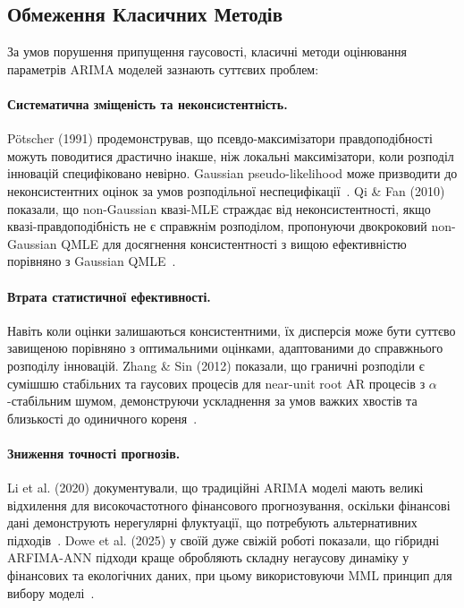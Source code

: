 \documentclass[12pt,a4paper]{article}
\begin{document}
\subsection{Обмеження Класичних Методів}
\label{subsec:limitations}

За умов порушення припущення гаусовості, класичні методи оцінювання параметрів ARIMA моделей зазнають суттєвих проблем:

\paragraph{Систематична зміщеність та неконсистентність.} Pötscher (1991) продемонстрував, що псевдо-максимізатори правдоподібності можуть поводитися драстично інакше, ніж локальні максимізатори, коли розподіл інновацій специфіковано невірно. Gaussian pseudo-likelihood може призводити до неконсистентних оцінок за умов розподільної неспецифікації~\cite{potscher1991noninvertibility}. Qi \& Fan (2010) показали, що non-Gaussian квазі-MLE страждає від неконсистентності, якщо квазі-правдоподібність не є справжнім розподілом, пропонуючи двокроковий non-Gaussian QMLE для досягнення консистентності з вищою ефективністю порівняно з Gaussian QMLE~\cite{qi2010non}.

\paragraph{Втрата статистичної ефективності.} Навіть коли оцінки залишаються консистентними, їх дисперсія може бути суттєво завищеною порівняно з оптимальними оцінками, адаптованими до справжнього розподілу інновацій. Zhang \& Sin (2012) показали, що граничні розподіли є сумішшю стабільних та гаусових процесів для near-unit root AR процесів з $\alpha$-стабільним шумом, демонструючи ускладнення за умов важких хвостів та близькості до одиничного кореня~\cite{zhang2012maximum}.

\paragraph{Зниження точності прогнозів.} Li et al. (2020) документували, що традиційні ARIMA моделі мають великі відхилення для високочастотного фінансового прогнозування, оскільки фінансові дані демонструють нерегулярні флуктуації, що потребують альтернативних підходів~\cite{li2020forecasting}. Dowe et al. (2025) у своїй дуже свіжій роботі показали, що гібридні ARFIMA-ANN підходи краще обробляють складну негаусову динаміку у фінансових та екологічних даних, при цьому використовуючи MML принцип для вибору моделі~\cite{dowe2025novel}.
\end{document}
